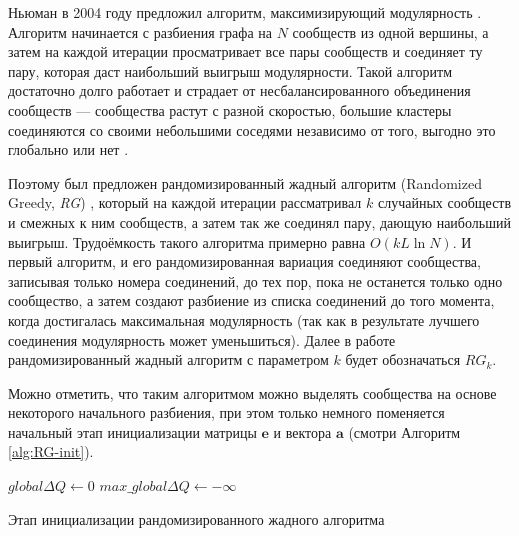 Ньюман в 2004 году предложил алгоритм, максимизирующий модулярность \cite{Newman:2004}. Алгоритм начинается с разбиения графа на $N$ сообществ из одной вершины, а затем на каждой итерации просматривает все пары сообществ и соединяет ту пару, которая даст наибольший выигрыш модулярности. Такой алгоритм достаточно долго работает и страдает от несбалансированного объединения сообществ --- сообщества растут с разной скоростью, большие кластеры соединяются со своими небольшими соседями независимо от того, выгодно это глобально или нет \cite{Ovelgoenne&Geyer-Schulz:2012a}.

Поэтому был предложен рандомизированный жадный алгоритм (Randomized Greedy, \emph{RG}) \cite{Ovelgoenne&Geyer-Schulz:2010}, который на каждой итерации рассматривал $k$ случайных сообществ и смежных к ним сообществ, а затем так же соединял пару, дающую наибольший выигрыш. Трудоёмкость такого алгоритма примерно равна $O(kL \ln N)$. И первый алгоритм, и его рандомизированная вариация соединяют сообщества, записывая только номера соединений, до тех пор, пока не останется только одно сообщество, а затем создают разбиение из списка соединений до того момента, когда достигалась максимальная модулярность (так как в результате лучшего соединения модулярность может уменьшиться). Далее в работе рандомизированный жадный алгоритм с параметром $k$ будет обозначаться $RG_k$.

Можно отметить, что таким алгоритмом можно выделять сообщества на основе некоторого начального разбиения, при этом только немного поменяется начальный этап инициализации матрицы $\mathbf{e}$ и вектора $\mathbf{a}$ (смотри Алгоритм \ref{alg:RG-init}).


\begin{algorithm}[h]
\SetAlgoLined
{}
$global\Delta Q \leftarrow 0$\;
$max\_global\Delta Q \leftarrow -\infty$\;
\BlankLine
\caption{Этап инициализации рандомизированного жадного алгоритма}
\label{alg:RG-init}
\end{algorithm}

